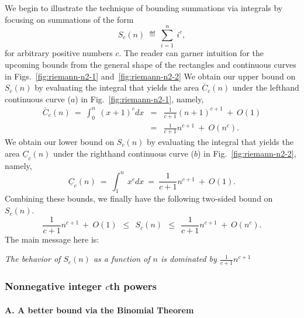 We begin to illustrate the technique of bounding summations via
integrals by focusing on summations of the form
\[ S_c(n) \ \eqdef \ \sum_{i=1}^n \ i^c, \]
for arbitrary positive numbers $c$.  The reader can garner intuition
for the upcoming bounds from the general shape of the rectangles and
continuous curves in Figs.~\ref{fig:riemann-n2-1}
and~\ref{fig:riemann-n2-2} We obtain our upper bound on $S_c(n)$ by
evaluating the integral that yields the area $\overline{C}_c(n)$ under
the lefthand continuous curve ($a$) in Fig.~\ref{fig:riemann-n2-1},
namely,
\begin{eqnarray}
\label{eq:upper-integral-xc}
\overline{C}_c(n) \ = \
\int_0^n \ (x+1)^c dx & = &
 \frac{1}{c+1} (n+1)^{c+1} \ + \ O(1) \\
\nonumber
 & = & \frac{1}{c+1} n^{c+1} \ + \ O(n^c).
\end{eqnarray}
We obtain our lower bound on $S_c(n)$ by evaluating the integral that
yields the area $\underline{C}_c(n)$ under the righthand continuous
curve ($b$) in Fig.~\ref{fig:riemann-n2-2}, namely,
\begin{equation}
\label{eq:lower-integral-xc}
\underline{C}_c(n) \ = \
\int_1^n \ x^c dx \ = \ \frac{1}{c+1} n^{c+1} \ + \ O(1).
\end{equation}
Combining these bounds, we finally have the following two-sided bound
on $S_c(n)$.
\begin{equation}
\label{eq:bounds-sum-xc}
\frac{1}{c+1} n^{c+1} \ + \ O(1)
  \ \ \leq \ \ S_c(n)
  \ \ \leq \ \ \frac{1}{c+1} n^{c+1} \ + \ O(n^c).
\end{equation}
The main message here is:

{\em The behavior of $S_c(n)$ as a function of $n$ is dominated by
  $\displaystyle \frac{1}{c+1} n^{c+1}$} \\
\hspace*{.2in}{\em as $n$ grows without bound.  }



\subsubsection{Nonnegative integer $c$th powers}
\label{sec:positive-integer-power}

\paragraph{\small\sf A. A better bound via the Binomial Theorem}

